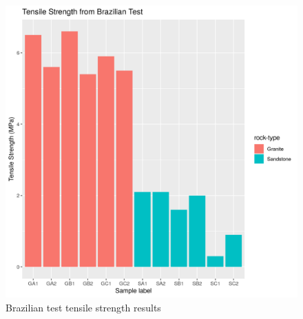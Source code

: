 \documentclass{article}
\begin{document}
\begin{figure}[t]
    \centering
    \includegraphics[width=0.7\linewidth]{brazilian.png}
    \caption{Brazilian test tensile strength results}
    \label{fig:brazilian-results}
\end{figure}

\pagebreak


\printbibliography
\end{document}
